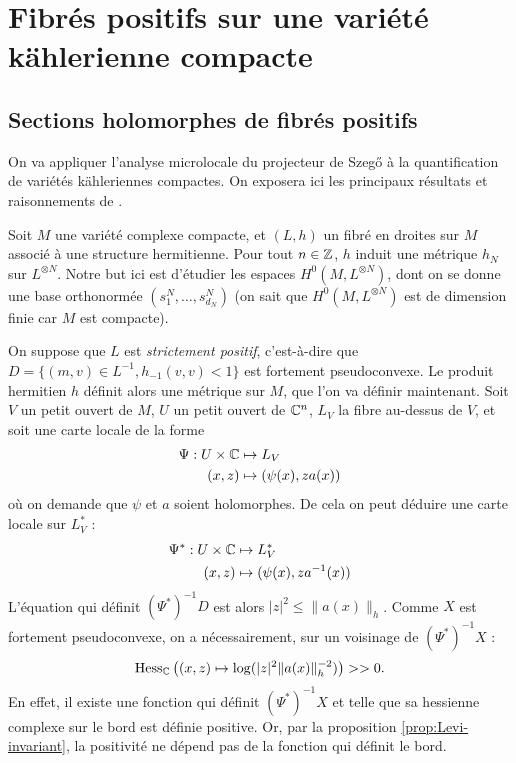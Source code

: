 \section{Fibrés positifs sur une variété kählerienne compacte}

\subsection{Sections holomorphes de fibrés positifs}

On va appliquer l'analyse microlocale du projecteur de Szeg\H{o} à la quantification de variétés kähleriennes compactes. On exposera ici les principaux résultats et raisonnements de \cite{Zelditch2000}.

Soit $M$ une variété complexe compacte, et $(L,h)$ un fibré en droites sur $M$ associé à une structure hermitienne. Pour tout $n \in \mathbb{Z}$, $h$ induit une métrique $h_N$ sur $L^{\otimes N}$. Notre but ici est d'étudier les espaces $H^0(M,L^{\otimes N})$, dont on se donne une base orthonormée $(s^N_1, \ldots, s^N_{d_N})$ (on sait que $H^0(M,L^{\otimes N})$ est de dimension finie car $M$ est compacte).

On suppose que $L$ est \emph{strictement positif}, c'est-à-dire que $D=\{(m,v) \in L^{-1}, h_{-1}(v,v) < 1\}$ est fortement pseudoconvexe. Le produit hermitien $h$ définit alors une métrique sur $M$, que l'on va définir maintenant. Soit $V$ un petit ouvert de $M$, $U$ un petit ouvert de $\mathbb{C}^n$, $L_V$ la fibre au-dessus de $V$, et soit une carte locale de la forme
\begin{align*}
	\Psi : U \times \mathbb{C} &\mapsto L_V\\
	(x,z) &\mapsto (\psi(x),za(x))
\end{align*}
où on demande que $\psi$ et $a$ soient holomorphes. De cela on peut déduire une carte locale sur $L^*_V$ :
\begin{align*}
	\Psi^* : U \times \mathbb{C} &\mapsto L^*_V\\
	(x,z) &\mapsto (\psi(x),za^{-1}(x))
\end{align*}
L'équation qui définit $(\Psi^*)^{-1}D$ est alors $|z|^2\leq\|a(x)\|_h$. Comme $X$ est fortement pseudoconvexe, on a nécessairement, sur un voisinage de $(\Psi^*)^{-1}X$ : 
\begin{equation*}
	\operatorname{Hess}_{\mathbb{C}} \left((x,z) \mapsto \log(|z|^2\|a(x)\|_h^{-2}) \right) >>0.
\end{equation*} En effet, il existe une fonction qui définit $(\Psi^*)^{-1}X$ et telle que sa hessienne complexe sur le bord est définie positive. Or, par la proposition \ref{prop:Levi-invariant}, la positivité ne dépend pas de la fonction qui définit le bord.

